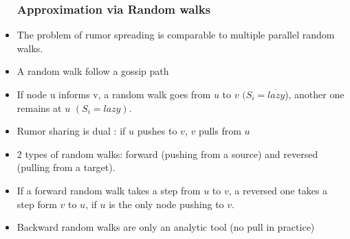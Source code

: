 \documentclass{beamer}
\begin{document}
  \begin{frame}
  \begin{itemize}

    \frametitle{ Approximation via Random walks}
    
    \item The problem of rumor spreading is comparable to multiple parallel random walks.
    \item A random walk follow a gossip path
   \item    If node u informs  v, a random walk goes from $u$ to $v$ $(S_i = \overline{lazy}$), another one remains at $u$ $(S_i=lazy)$. 
   \begin{figure}[h]
\centering
{}

\label{fig:lazyFSM}
\end{figure}

\end{itemize}

  \end{frame}
\begin{frame}
\begin{itemize}
\frametitle{Forward and backward random walks}
\item Rumor sharing is dual : if $u$ pushes to $v$, $v$ pulls from $u$
\item 2 types of random walks: forward (pushing from a source) and reversed (pulling from a target). 
\item If a forward random walk takes a step from $u$ to $v$, a reversed one   takes a step form $v$ to $u$, if $u$ is the only node pushing to $v$.
\item Backward random walks are only an analytic tool (no pull in practice)
 
\end{itemize}

\end{frame}
\end{document}
